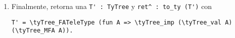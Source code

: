 \begin{enumerate}
    \begin{lstlisting}
f = (fun U => to_ty (tyTree_M (apply_sort A U)))
    \end{lstlisting}
    y luego aplicamos \lstinline{f} a \lstinline{curry}, de esa manera, la función pasa a tener tipo \lstinline{to_ty (\tyTree_MFA A)}.
    \begin{lstlisting}
f : \forall x$_1$ x$_n$ => \tyTree_MFA (A x$_1$ ... x$_n$)
    \end{lstlisting}
    \item Finalmente, \lift{} retorna una \lstinline{T' : TyTree} y \lstinline{ret^ : to_ty (T')} con
    \begin{lstlisting}
T' = \tyTree_FATeleType (fun A => \tyTree_imp (\tyTree_val A) (\tyTree_MFA A)).
    \end{lstlisting}
\end{enumerate}